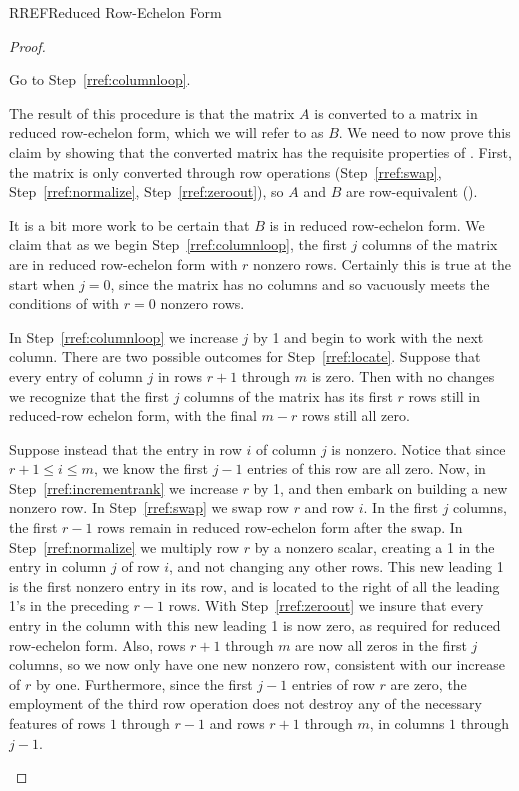 \begin{subsect}{RREF}{Reduced Row-Echelon Form}
\begin{proof}
\begin{para}
\begin{enumerate}
Go to Step~\ref{rref:columnloop}.
%
\end{enumerate}\end{para}
%
\begin{para}The result of this procedure is that the matrix $A$ is converted to a matrix in reduced row-echelon form, which we will refer to as $B$.  We need to now prove this claim by showing that the converted matrix has the requisite properties of .  First, the matrix is only converted through row operations (Step~\ref{rref:swap}, Step~\ref{rref:normalize}, Step~\ref{rref:zeroout}), so $A$ and $B$ are row-equivalent ().\end{para}
%
\begin{para}It is a bit more work to be certain that $B$ is in reduced row-echelon form.
We claim that as we begin Step~\ref{rref:columnloop}, the first $j$ columns of the matrix are in reduced row-echelon form with $r$ nonzero rows.   Certainly this is true at the start when $j=0$, since the matrix has no columns and so vacuously meets the conditions of  with $r=0$ nonzero rows.\end{para}
%
\begin{para}In Step~\ref{rref:columnloop} we increase $j$ by 1 and begin to work with the next column.  There are two possible outcomes for Step~\ref{rref:locate}.  Suppose that every entry of column $j$ in rows $r+1$ through $m$ is zero.  Then with no changes we recognize that the first $j$ columns of the matrix has its first $r$ rows still in reduced-row echelon form, with the final $m-r$ rows still all zero.\end{para}
%
\begin{para}Suppose instead that the entry in row $i$ of column $j$ is nonzero.  Notice that since $r+1\leq i\leq m$, we know the first $j-1$ entries of this row are all zero.  Now, in Step~\ref{rref:incrementrank} we increase $r$ by 1, and then embark on building a new nonzero row.  In Step~\ref{rref:swap} we swap row $r$ and row $i$.  In the first $j$ columns, the first $r-1$ rows remain in reduced row-echelon form after the swap.  In Step~\ref{rref:normalize} we multiply row $r$ by a nonzero scalar, creating a 1 in the entry in column $j$ of row $i$, and not changing any other rows.  This new leading 1 is the first nonzero entry in its row, and is located to the right of all the leading 1's in the preceding $r-1$ rows.  With Step~\ref{rref:zeroout} we insure that every entry in the column with this new leading 1 is now zero, as required for reduced row-echelon form.  Also, rows $r+1$ through $m$ are now all zeros in the first $j$ columns, so we now only have one new nonzero row, consistent with our increase of $r$ by one.  Furthermore, since the first $j-1$ entries of row $r$ are zero, the employment of the third row operation does not destroy any of the necessary features of rows $1$ through $r-1$ and rows $r+1$ through $m$, in columns $1$ through $j-1$.\end{para}

\end{proof}
\end{subsect}

